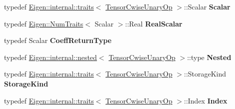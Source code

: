 \begin{DoxyCompactItemize}
\mbox{\label{class_eigen_1_1_tensor_cwise_unary_op_a5ab327094bed5a2afba69bb9386ff44d}} 
typedef \hyperlink{struct_eigen_1_1internal_1_1traits}{Eigen\+::internal\+::traits}$<$ \hyperlink{class_eigen_1_1_tensor_cwise_unary_op}{Tensor\+Cwise\+Unary\+Op} $>$\+::Scalar {\bfseries Scalar}
\item 
\mbox{\label{class_eigen_1_1_tensor_cwise_unary_op_ae7784743a8b3eecb64567d93731c487e}} 
typedef \hyperlink{group___core___module_struct_eigen_1_1_num_traits}{Eigen\+::\+Num\+Traits}$<$ Scalar $>$\+::Real {\bfseries Real\+Scalar}
\item 
\mbox{\label{class_eigen_1_1_tensor_cwise_unary_op_a5eeb6543700ffe32c1d996e1b0d79e50}} 
typedef Scalar {\bfseries Coeff\+Return\+Type}
\item 
\mbox{\label{class_eigen_1_1_tensor_cwise_unary_op_acc4894a5f4d28b24d67aaa35ed135192}} 
typedef \hyperlink{struct_eigen_1_1internal_1_1nested}{Eigen\+::internal\+::nested}$<$ \hyperlink{class_eigen_1_1_tensor_cwise_unary_op}{Tensor\+Cwise\+Unary\+Op} $>$\+::type {\bfseries Nested}
\item 
\mbox{\label{class_eigen_1_1_tensor_cwise_unary_op_a0162f82932dc0cf82d3a9d538bd7805f}} 
typedef \hyperlink{struct_eigen_1_1internal_1_1traits}{Eigen\+::internal\+::traits}$<$ \hyperlink{class_eigen_1_1_tensor_cwise_unary_op}{Tensor\+Cwise\+Unary\+Op} $>$\+::Storage\+Kind {\bfseries Storage\+Kind}
\item 
\mbox{\label{class_eigen_1_1_tensor_cwise_unary_op_aae1bc0933bbef825c05ed8d40d8b3b1a}} 
typedef \hyperlink{struct_eigen_1_1internal_1_1traits}{Eigen\+::internal\+::traits}$<$ \hyperlink{class_eigen_1_1_tensor_cwise_unary_op}{Tensor\+Cwise\+Unary\+Op} $>$\+::Index {\bfseries Index}
\end{DoxyCompactItemize}
